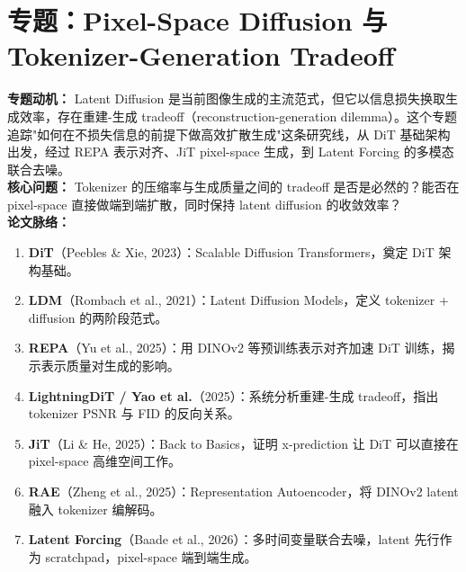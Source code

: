 
\section*{专题：Pixel-Space Diffusion 与 Tokenizer-Generation Tradeoff}
{}

\begin{conceptbox}
\textbf{专题动机：} Latent Diffusion 是当前图像生成的主流范式，但它以信息损失换取生成效率，存在重建-生成 tradeoff（reconstruction-generation dilemma）。这个专题追踪"如何在不损失信息的前提下做高效扩散生成"这条研究线，从 DiT 基础架构出发，经过 REPA 表示对齐、JiT pixel-space 生成，到 Latent Forcing 的多模态联合去噪。\\
\textbf{核心问题：} Tokenizer 的压缩率与生成质量之间的 tradeoff 是否是必然的？能否在 pixel-space 直接做端到端扩散，同时保持 latent diffusion 的收敛效率？\\
\textbf{论文脉络：}
\begin{enumerate}[leftmargin=1.8em]
  \item \textbf{DiT}（Peebles \& Xie, 2023）：Scalable Diffusion Transformers，奠定 DiT 架构基础。
  \item \textbf{LDM}（Rombach et al., 2021）：Latent Diffusion Models，定义 tokenizer + diffusion 的两阶段范式。
  \item \textbf{REPA}（Yu et al., 2025）：用 DINOv2 等预训练表示对齐加速 DiT 训练，揭示表示质量对生成的影响。
  \item \textbf{LightningDiT / Yao et al.}（2025）：系统分析重建-生成 tradeoff，指出 tokenizer PSNR 与 FID 的反向关系。
  \item \textbf{JiT}（Li \& He, 2025）：Back to Basics，证明 x-prediction 让 DiT 可以直接在 pixel-space 高维空间工作。
  \item \textbf{RAE}（Zheng et al., 2025）：Representation Autoencoder，将 DINOv2 latent 融入 tokenizer 编解码。
  \item \textbf{Latent Forcing}（Baade et al., 2026）：多时间变量联合去噪，latent 先行作为 scratchpad，pixel-space 端到端生成。
\end{enumerate}
\end{conceptbox}


